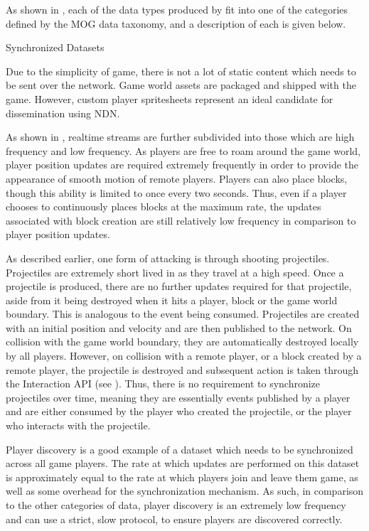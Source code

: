 As shown in , each of the data types produced by \game{} fit into one of the categories defined by the MOG data taxonomy, and a description of each is given below.

\begin{labeling}{Synchronized Datasets }
    \item[Static Content] Due to the simplicity of game, there is not a lot of static content which needs to be sent over the network. Game world assets are packaged and shipped with the game. However, custom player spritesheets represent an ideal candidate for dissemination using NDN.
    \item[Realtime Streams] As shown in , realtime streams are further subdivided into those which are high frequency and low frequency.\break\break
    As players are free to roam around the game world, player position updates are required extremely frequently in order to provide the appearance of smooth motion of remote players.\break\break
    Players can also place blocks, though this ability is limited to once every two seconds. Thus, even if a player chooses to continuously places blocks at the maximum rate, the updates associated with block creation are still relatively low frequency in comparison to player position updates.
    \item[Non Synced] As described earlier, one form of attacking is through shooting projectiles. Projectiles are extremely short lived in \game{} as they travel at a high speed. Once a projectile is produced, there are no further updates required for that projectile, aside from it being destroyed when it hits a player, block or the game world boundary. This is analogous to the event being consumed. Projectiles are created with an initial position and velocity and are then published to the network. On collision with the game world boundary, they are automatically destroyed locally by all players. However, on collision with a remote player, or a block created by a remote player, the projectile is destroyed and subsequent action is taken through the Interaction API (see ). Thus, there is no requirement to synchronize projectiles over time, meaning they are essentially events published by a player and are either consumed by the player who created the projectile, or the player who interacts with the projectile.
    \item[Synchronized Datasets] Player discovery is a good example of a dataset which needs to be synchronized across all game players. The rate at which updates are performed on this dataset is approximately equal to the rate at which players join and leave them game, as well as some overhead for the synchronization mechanism. As such, in comparison to the other categories of data, player discovery is an extremely low frequency and can use a strict, slow protocol, to ensure players are discovered correctly.
\end{labeling}

